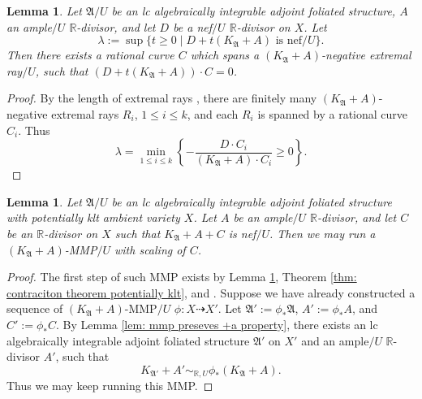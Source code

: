 \documentclass[12pt]{amsart}
\numberwithin{equation}{section}
\newcommand{\Rr}{\mathbb{R}}
\newcommand{\Aa}{{\mathfrak{A}}}
\newtheorem{lem}[thm]{Lemma}
\theoremstyle{definition}
\theoremstyle{definition}
\theoremstyle{definition}
\begin{document}
\begin{lem}\label{lem: ai afs scaling number obtained}
    Let $\Aa/U$ be an lc algebraically integrable adjoint foliated structure, $A$ an ample$/U$ $\Rr$-divisor, and let $D$ be a nef$/U$ $\Rr$-divisor on $X$. Let
    $$\lambda:=\sup\{t\geq 0\mid D+t(K_{\Aa}+A)\text{ is nef}/U\}.$$
    Then there exists a rational curve $C$ which spans a $(K_{\Aa}+A)$-negative extremal ray$/U$, such that $(D+t(K_{\Aa}+A))\cdot C=0$.
\end{lem}
\begin{proof}
    By the length of extremal rays \cite[Theorem 1.3(2)]{CHLMSSX24}, there are finitely many $(K_{\Aa}+A)$-negative extremal rays $R_i$, $1\leq i\leq k$, and each $R_i$ is spanned by a rational curve $C_i$. Thus
    $$\lambda=\min_{1\leq i\leq k}\left\{-\frac{D\cdot C_i}{(K_{\Aa}+A)\cdot C_i}\geq 0\right\}.$$
\end{proof}

\begin{lem}\label{lem: ai afs can run mmp with scaling}
    Let $\Aa/U$ be an lc algebraically integrable adjoint foliated structure with potentially klt ambient variety $X$. Let $A$ be an ample$/U$ $\Rr$-divisor, and let $C$ be an $\Rr$-divisor on $X$ such that $K_{\Aa}+A+C$ is nef$/U$. Then we may run a $(K_{\Aa}+A)$-MMP$/U$ with scaling of $C$.
\end{lem}
\begin{proof}
    The first step of such MMP exists by Lemma \ref{lem: ai afs scaling number obtained}, Theorem \ref{thm: contraciton theorem potentially klt}, and \cite[Theorem 1.5]{CHLMSSX24}. Suppose we have already constructed a sequence of $(K_{\Aa}+A)$-MMP$/U$ $\phi: X\dashrightarrow X'$. Let $\Aa':=\phi_*\Aa$, $A':=\phi_*A$, and $C':=\phi_*C$. By Lemma \ref{lem: mmp preseves +a property}, there exists an lc algebraically integrable adjoint foliated structure $\Aa'$ on $X'$ and an ample$/U$ $\Rr$-divisor $A'$, such that $$K_{\Aa'}+A'\sim_{\mathbb R,U}\phi_*(K_{\Aa}+A).$$
    Thus we may keep running this MMP.
\end{proof}
\end{document}
